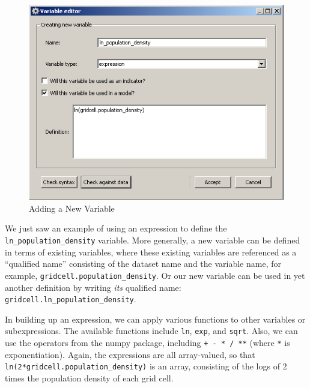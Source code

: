 \begin{figure}[htp]
\begin{center}
\includegraphics[scale=0.6]{part-gui/images/model-manager-variable-library-new-variable.png}
\end{center}
\caption{Adding a New Variable}
\label{fig:variable-library-new-variable}
\end{figure}

We just saw an example of using an expression to define the 
\mbox {\tt ln\_population\_density} variable.  More generally, a new
variable can be defined in terms of existing variables, where these
existing variables are referenced as a ``qualified name'' consisting of the
dataset name and the variable name, for example, 
\mbox{\tt gridcell.population\_density}.  Or our new variable can be used
in yet another definition by writing \emph{its} qualified name: 
\mbox{\tt gridcell.ln\_population\_density}.

In building up an expression, we can apply various functions to other
variables or subexpressions.  The available functions include {\tt ln},
{\tt exp}, and {\tt sqrt}.  Also, we can use the operators from the numpy
package, including {\tt + - * / **} (where {\tt **} is exponentiation).
Again, the expressions are all array-valued, so that 
\mbox{\tt ln(2*gridcell.population\_density)} is an array, 
consisting of the logs of 2 times the population density of each grid cell.
